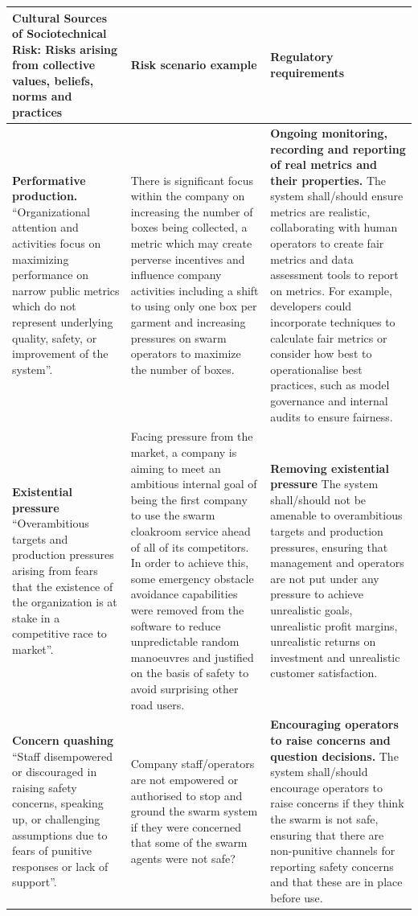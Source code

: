 \documentclass[lettersize,journal]{IEEEtran}
\begin{document}
\begin{landscape}
\begin{table}[]
    \centering
    \begin{tabular}{|p{0.3\textheight}|p{0.3\textheight}|p{0.4\textheight}|}
        \hline
        \textbf{Cultural Sources of Sociotechnical Risk:} Risks arising from collective values, beliefs, norms and practices & \textbf{Risk scenario example} & 	\textbf{Regulatory requirements}\\
        \hline
        \textbf{Performative production.} ``Organizational attention and activities focus on maximizing performance on narrow public metrics which do not represent underlying quality, safety, or improvement of the system”. \cite{macrae2021learning} & There is significant focus within the company on increasing the number of boxes being collected, a metric which may create perverse incentives and influence company activities including a shift to using only one box per garment and increasing pressures on swarm operators to maximize the number of boxes. & \textbf{Ongoing monitoring, recording and reporting of real metrics and their properties.} The system shall/should ensure metrics are realistic, collaborating with human operators to create fair metrics and data assessment tools to report on metrics. For example, developers could incorporate techniques to calculate fair metrics or consider how best to operationalise best practices, such as model governance and internal audits to ensure fairness.\\
        \hline
        \textbf{Existential pressure} ``Overambitious targets and production pressures arising from fears that the existence of the organization is at stake in a competitive race to market”. \cite{macrae2021learning} & Facing pressure from the market, a company is aiming to meet an ambitious internal goal of being the first company to use the swarm cloakroom service ahead of all of its competitors. In order to achieve this, some emergency obstacle avoidance capabilities were removed from the software to reduce unpredictable random manoeuvres and justified on the basis of safety to avoid surprising other road users. & \textbf{Removing existential pressure} The system shall/should not be amenable to overambitious targets and production pressures, ensuring that management and operators are not put under any pressure to achieve unrealistic goals, unrealistic profit margins, unrealistic returns on investment and unrealistic customer satisfaction.\\
        \hline
        \textbf{Concern quashing} ``Staff disempowered or discouraged in raising safety concerns, speaking up, or challenging assumptions due to fears of punitive responses or lack of support”. \cite{macrae2021learning} & Company staff/operators are not empowered or authorised to stop and ground the swarm system if they were concerned that some of the swarm agents were not safe? & \textbf{Encouraging operators to raise concerns and question decisions.} The system shall/should encourage operators to raise concerns if they think the swarm is not safe, ensuring that there are non-punitive channels for reporting safety concerns and that these are in place before use.\\

\end{tabular}
\end{table}
\end{landscape}
\end{document}
